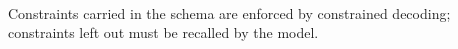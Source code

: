\begin{table}[t]
\centering
\caption{E5: size of the generated \texttt{write\_setpoint} tool schema for Line 1.}
\label{tab:e5-schema}
\footnotesize
{}
\\[4pt]\begin{minipage}{\linewidth}\footnotesize Constraints carried in the schema are enforced by constrained decoding; constraints left out must be recalled by the model.\end{minipage}
\end{table}
